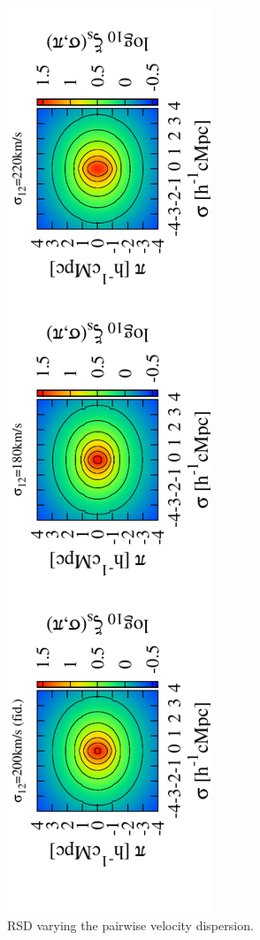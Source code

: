 \documentclass[useAMS,usenatbib,twocolumn]{mn2e}
\begin{document}
\begin{figure}
 \begin{center}
  \includegraphics[angle=-90,width=\textwidth]{figure/RSDs_1-9-10.pdf}
  \caption{RSD varying the pairwise velocity dispersion.}\label{RSD_disp}
 \end{center}
\end{figure}
\end{document}
